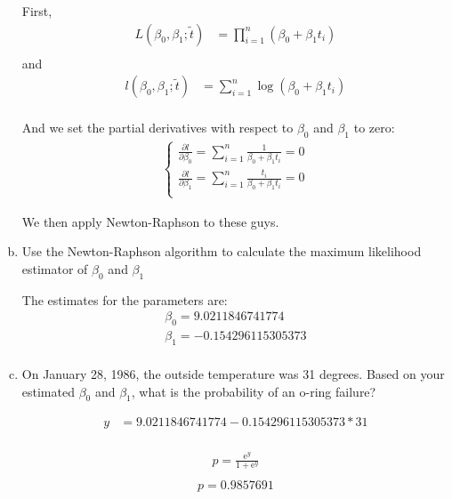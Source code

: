 \documentclass[12pt]{article}
\begin{document}
\begin{enumerate}[(a)]
First,
\begin{align*}
L(\beta_0, \beta_1 ; \tilde t) &= \prod_{i=1}^n ( \beta_0 + \beta_1 t_i )\\
\end{align*}
and
\begin{align*}
l(\beta_0, \beta_1 ; \tilde t) &= \sum_{i=1}^n \log( \beta_0 + \beta_1 t_i )\\
\end{align*}

And we set the partial derivatives with respect to $\beta_0$ and $\beta_1$ to zero:
\begin{align*}
    \begin{cases} 
         \frac {\partial l} {\partial \beta_0} = \sum_{i=1}^n \frac{1} {\beta_0 + \beta_1 t_i} = 0\\
         \frac {\partial l} {\partial \beta_1} = \sum_{i=1}^n \frac{t_i} {\beta_0 + \beta_1 t_i} = 0\\
    \end{cases}
\end{align*}


We then apply Newton-Raphson to these guys.

\item Use the Newton-Raphson algorithm to calculate the maximum likelihood estimator of $\beta_0$ and $\beta_1$

The estimates for the parameters are:
\begin{align*}
\beta_0 = 9.0211846741774\\
\beta_1 = -0.154296115305373\\
\end{align*}




\item On January 28, 1986, the outside temperature was 31 degrees. Based on your estimated $\beta_0$ and $\beta_1$, what is the probability of an o-ring failure?

\begin{align*}
y &= 9.0211846741774-0.154296115305373  * 31 \\
\end{align*}

\begin{align*}
p = \frac{\mathrm{e}^y}{ 1 + {\mathrm{e}^y}}\\
\end{align*}
\begin{align*}
\boxed{p = 0.9857691}
\end{align*}



\end{enumerate}
\end{document}

